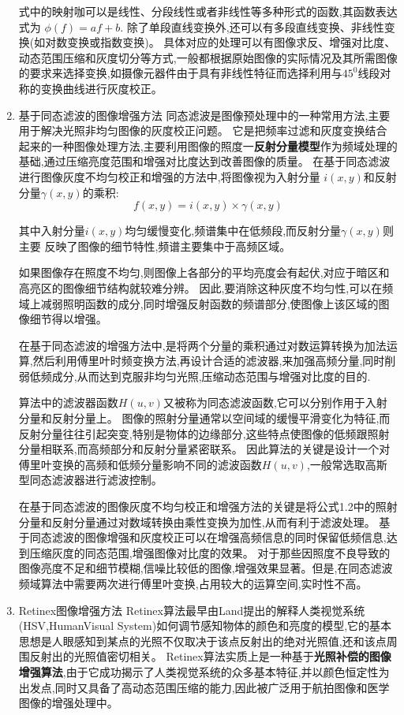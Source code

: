 \documentclass{amsart}
\begin{document}
\begin{enumerate}
式中的映射咖可以是线性、分段线性或者非线性等多种形式的函数,其函数表达式为
$\phi(f)=af+b$.
除了单段直线变换外,还可以有多段直线变换、非线性变换(如对数变换或指数变换)。
具体对应的处理可以有图像求反、增强对比度、动态范围压缩和灰度切分等方式,一般都根据原始图像的实际情况及其所需图像的要求来选择变换,如摄像元器件由于具有非线性特征而选择利用与$45^0$线段对称的变换曲线进行灰度校正。
\item 基于同态滤波的图像增强方法
  同态滤波是图像预处理中的一种常用方法,主要用于解决光照非均匀图像的灰度校正问题。
  它是把频率过滤和灰度变换结合起来的一种图像处理方法,主要利用图像的照度一\textbf{反射分量模型}作为频域处理的基础,通过压缩亮度范围和增强对比度达到改善图像的质量。
  在基于同态滤波进行图像灰度不均匀校正和增强的方法中,将图像视为入射分量
  $i(x,y)$和反射分量$\gamma(x,y)$的乘积:
  \begin{equation}
    \label{eq:21}
    f(x,y)=i(x,y)\times\gamma(x,y)
  \end{equation}


其中入射分量$i(x,y)$均匀缓慢变化,频谱集中在低频段,而反射分量$\gamma(x,y)$则主要
反映了图像的细节特性,频谱主要集中于高频区域。

如果图像存在照度不均匀,则图像上各部分的平均亮度会有起伏,对应于暗区和高亮区的图像细节结构就较难分辨。
因此,要消除这种灰度不均匀性,可以在频域上减弱照明函数的成分,同时增强反射函数的频谱部分,使图像上该区域的图像细节得以增强。

在基于同态滤波的增强方法中,是将两个分量的乘积通过对数运算转换为加法运算,然后利用傅里叶时频变换方法,再设计合适的滤波器,来加强高频分量,同时削弱低频成分,从而达到克服非均匀光照,压缩动态范围与增强对比度的目的.

算法中的滤波器函数$H(u,v)$又被称为同态滤波函数,它可以分别作用于入射分量和反射分量上。
图像的照射分量通常以空间域的缓慢平滑变化为特征,而反射分量往往引起突变,特别是物体的边缘部分,这些特点使图像的低频跟照射分量相联系,而高频部分和反射分量紧密联系。
因此算法的关键是设计一个对傅里叶变换的高频和低频分量影响不同的滤波函数$H(u,v)$,一般常选取高斯型同态滤波器进行滤波控制。


在基于同态滤波的图像灰度不均匀校正和增强方法的关键是将公式1.2中的照射分量和反射分量通过对数域转换由乘性变换为加性,从而有利于滤波处理。
基于同态滤波的图像增强和灰度校正可以在增强高频信息的同时保留低频信息,达到压缩灰度的同态范围,增强图像对比度的效果。
对于那些因照度不良导致的图像亮度不足和细节模糊,信噪比较低的图像,增强效果显著。但是,在同态滤波频域算法中需要两次进行傅里叶变换,占用较大的运算空间,实时性不高。
\item Retinex图像增强方法
  Retinex算法最早由Land提出的解释人类视觉系统(HSV,HumanVisual System)如何调节感知物体的颜色和亮度的模型,它的基本思想是人眼感知到某点的光照不仅取决于该点反射出的绝对光照值,还和该点周围反射出的光照值密切相关。
  Retinex算法实质上是一种基于\textbf{光照补偿的图像增强算法},由于它成功揭示了人类视觉系统的众多基本特征,并以颜色恒定性为出发点,同时又具备了高动态范围压缩的能力,因此被广泛用于航拍图像和医学图像的增强处理中。



\end{enumerate}
\end{document}
